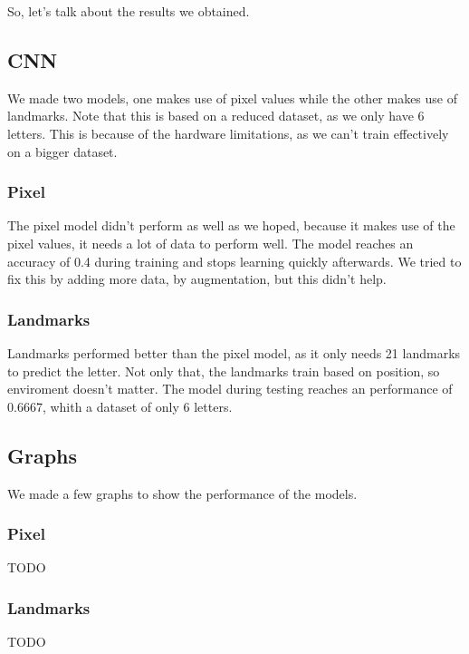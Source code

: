 \documentclass[../paper.tex]{subfiles}
\begin{document}
    So, let's talk about the results we obtained.\\
    \subsection{CNN}
    We made two models, one makes use of pixel values while the other makes use of landmarks.
    Note that this is based on a reduced dataset, as we only have 6 letters.
    This is because of the hardware limitations, as we can't train effectively on a bigger dataset.
    \subsubsection{Pixel}
    The pixel model didn't perform as well as we hoped, because it makes use of the pixel values, it needs a lot of data to perform well.
    The model reaches an accuracy of 0.4 during training and stops learning quickly afterwards.
    We tried to fix this by adding more data, by augmentation, but this didn't help.
    \subsubsection{Landmarks}
    Landmarks performed better than the pixel model, as it only needs 21 landmarks to predict the letter.
    Not only that, the landmarks train based on position, so enviroment doesn't matter.
    The model during testing reaches an performance of 0.6667, whith a dataset of only 6 letters.
    \subsection{Graphs}
    We made a few graphs to show the performance of the models.
    \subsubsection{Pixel}
    TODO
    \subsubsection{Landmarks}
    TODO
\end{document}
